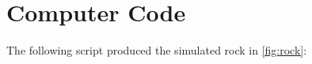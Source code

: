 \chapter{Computer Code}
\label{sec:second-app}

The following \matlab script produced the simulated rock in \cref{fig:rock}:

